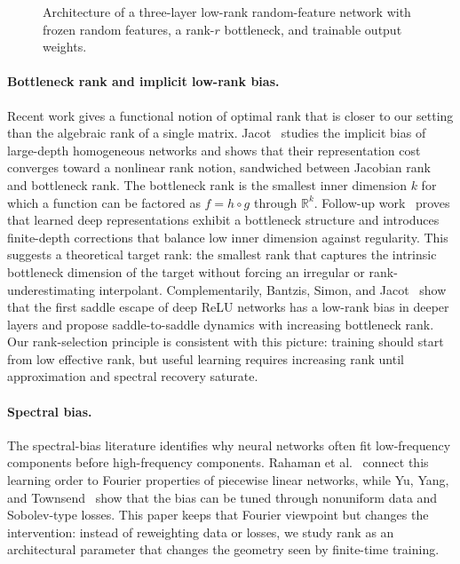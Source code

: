 \documentclass{article}
\newcommand{\R}{\mathbb{R}}
\begin{document}
\begin{figure}[t]
{%
}
\caption{Architecture of a three-layer low-rank random-feature network with frozen random features, a rank-$r$ bottleneck, and trainable output weights.}
\label{fig:architecture}
\end{figure}

\paragraph{Bottleneck rank and implicit low-rank bias.}
Recent work gives a functional notion of optimal rank that is closer to our setting than the algebraic rank of a single matrix. Jacot~\cite{jacot2022implicitrank} studies the implicit bias of large-depth homogeneous networks and shows that their representation cost converges toward a nonlinear rank notion, sandwiched between Jacobian rank and bottleneck rank. The bottleneck rank is the smallest inner dimension $k$ for which a function can be factored as $f=h\circ g$ through $\R^k$. Follow-up work~\cite{jacot2023bottleneck} proves that learned deep representations exhibit a bottleneck structure and introduces finite-depth corrections that balance low inner dimension against regularity. This suggests a theoretical target rank: the smallest rank that captures the intrinsic bottleneck dimension of the target without forcing an irregular or rank-underestimating interpolant. Complementarily, Bantzis, Simon, and Jacot~\cite{bantzis2025saddle} show that the first saddle escape of deep ReLU networks has a low-rank bias in deeper layers and propose saddle-to-saddle dynamics with increasing bottleneck rank. Our rank-selection principle is consistent with this picture: training should start from low effective rank, but useful learning requires increasing rank until approximation and spectral recovery saturate.

\paragraph{Spectral bias.}
The spectral-bias literature identifies why neural networks often fit low-frequency components before high-frequency components. Rahaman et al.~\cite{rahaman2019} connect this learning order to Fourier properties of piecewise linear networks, while Yu, Yang, and Townsend~\cite{yu2022tuning} show that the bias can be tuned through nonuniform data and Sobolev-type losses. This paper keeps that Fourier viewpoint but changes the intervention: instead of reweighting data or losses, we study rank as an architectural parameter that changes the geometry seen by finite-time training.
\end{document}
